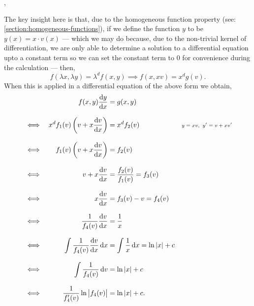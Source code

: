 \documentclass[../MathsNotesBase.tex]{subfiles}
\begin{document}
{		\biggerskip\sep\biggerskip
		\parbox{\linewidth}{
		}
		
		\bigskip{}
		
		The key insight here is that, due to the homogeneous function property (see: \ref{section:homogeneous-functions}), if we define the function $y$ to be ${ y(x) = x \cdot v(x) }$ --- which we may do because, due to the non-trivial kernel of differentiation, we are only able to determine a solution to a differential equation upto a constant term so we can set the constant term to 0 for convenience during the calculation --- then,
		\[ f(\lambda x, \lambda y) = \lambda^d f(x,y) \implies f(x,xv) = x^d g(v). \]
		When this is applied in a differential equation of the above form we obtain,
		\begin{align*}
			&& f(x,y)\frac{\dif y}{\dif x} &= g(x,y) \\[8pt]
			&\iff & x^d f_1(v) \left(v + x\frac{\dif v}{\dif x}\right) &= x^d f_2(v) &\sidecomment{${y = xv,\,\, y' = v + xv'}$} \\[8pt]
			&\iff & f_1(v) \left(v + x\frac{\dif v}{\dif x}\right) &= f_2(v) &\sidecomment{} \\[8pt]
			&\iff & v + x\frac{\dif v}{\dif x} &= \frac{f_2(v)}{f_1(v)} = f_3(v) &\sidecomment{} \\[8pt]
			&\iff & x\frac{\dif v}{\dif x} &= f_3(v) - v = f_4(v) &\sidecomment{} \\[8pt]
			&\iff & \frac{1}{f_4(v)}\frac{\dif v}{\dif x} &= \frac{1}{x} &\sidecomment{} \\[8pt]
			&\iff & \int \frac{1}{f_4(v)}\frac{\dif v}{\dif x} \dif x &= \int \frac{1}{x} \dif x = \ln{\abs{x}} + c &\sidecomment{} \\[8pt]
			&\iff & \int \frac{1}{f_4(v)} \dif v &= \ln{\abs{x}} + c &\sidecomment{} \\[8pt]
			&\iff & \frac{1}{f_4'(v)} \ln{\abs{f_4(v)}} &= \ln{\abs{x}} + c. &\sidecomment{} \\[8pt]
		\end{align*}
	}




\end{document}
